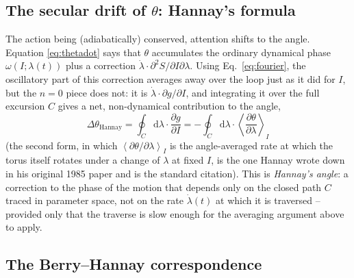 \documentclass[11pt]{book}
\newcommand{\dd}{\mathrm{d}}
\newcommand{\avg}[1]{\left\langle #1 \right\rangle}
\begin{document}
\subsection{The secular drift of $\theta$: Hannay's formula}

The action being (adiabatically) conserved, attention shifts to the angle. Equation
\eqref{eq:thetadot} says that $\theta$ accumulates the ordinary dynamical phase $\omega(I;\lambda(t))$
plus a correction $\dot\lambda\cdot\partial^2S/\partial I\partial\lambda$. Using
Eq.~\eqref{eq:fourier}, the oscillatory part of this correction averages away over the loop just
as it did for $I$, but the $n=0$ piece does not: it is $\dot\lambda \cdot \partial g/\partial I$,
and integrating it over the full excursion $C$ gives a net, non-dynamical contribution to the
angle,
\begin{equation}
\boxed{\ \Delta\theta_{\text{Hannay}} = \oint_C \dd\lambda \cdot \frac{\partial g}{\partial I}
= -\oint_C \dd\lambda \cdot \avg{\frac{\partial\theta}{\partial\lambda}}_{I} \ }
\label{eq:hannay}
\end{equation}
(the second form, in which $\avg{\partial\theta/\partial\lambda}_I$ is the angle-averaged rate at
which the torus itself rotates under a change of $\lambda$ at fixed $I$, is the one Hannay wrote
down in his original 1985 paper and is the standard citation). This is \emph{Hannay's angle}: a
correction to the phase of the motion that depends only on the closed path $C$ traced in parameter
space, not on the rate $\dot\lambda(t)$ at which it is traversed -- provided only that the traverse
is slow enough for the averaging argument above to apply.

\subsection{The Berry--Hannay correspondence}
\end{document}
